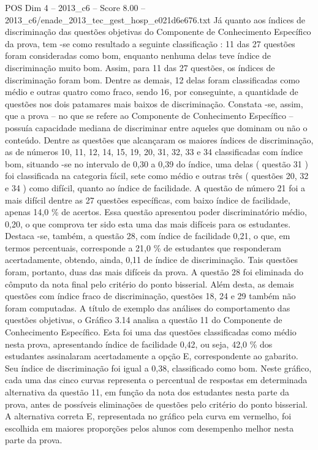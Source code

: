 \begin{textsample}{POS Dim 4 – 2013\_c6 – Score 8.00 – 2013\_c6/enade\_2013\_tec\_gest\_hosp\_e021d6e676.txt}
Já quanto aos índices de discriminação das questões objetivas do Componente de Conhecimento Específico da prova, tem -se como resultado a seguinte classificação : 11 das 27 questões foram consideradas como bom, enquanto nenhuma delas teve índice de discriminação muito bom.
Assim, para 11 das 27 questões, os índices de discriminação foram bom.
Dentre as demais, 12 delas foram classificadas como médio e outras quatro como fraco, sendo 16, por conseguinte, a quantidade de questões nos dois patamares mais baixos de discriminação.
Constata -se, assim, que a prova – no que se refere ao Componente de Conhecimento Específico – possuía capacidade mediana de discriminar entre aqueles que dominam ou não o conteúdo.
Dentre as questões que alcançaram os maiores índices de discriminação, as de números 10, 11, 12, 14, 15, 19, 20, 31, 32, 33 e 34 classificadas com índice bom, situando -se no intervalo de 0,30 a 0,39 do índice, uma delas ( questão 31 ) foi classificada na categoria fácil, sete como médio e outras três ( questões 20, 32 e 34 ) como difícil, quanto ao índice de facilidade.
A questão de número 21 foi a mais difícil dentre as 27 questões específicas, com baixo índice de facilidade, apenas 14,0 \% de acertos.
Essa questão apresentou poder discriminatório médio, 0,20, o que comprova ter sido esta uma das mais difíceis para os estudantes.
Destaca -se, também, a questão 28, com índice de facilidade 0,21, o que, em termos percentuais, corresponde a 21,0 \% de estudantes que responderam acertadamente, obtendo, ainda, 0,11 de índice de discriminação.
Tais questões foram, portanto, duas das mais difíceis da prova.
A questão 28 foi eliminada do cômputo da nota final pelo critério do ponto bisserial.
Além desta, as demais questões com índice fraco de discriminação, questões 18, 24 e 29 também não foram computadas.
A título de exemplo das análises do comportamento das questões objetivas, o Gráfico 3.14 analisa a questão 11 do Componente de Conhecimento Específico.
Esta foi uma das questões classificadas como médio nesta prova, apresentando índice de facilidade 0,42, ou seja, 42,0 \% dos estudantes assinalaram acertadamente a opção E, correspondente ao gabarito.
Seu índice de discriminação foi igual a 0,38, classificado como bom.
Neste gráfico, cada uma das cinco curvas representa o percentual de respostas em determinada alternativa da questão 11, em função da nota dos estudantes nesta parte da prova, antes de possíveis eliminações de questões pelo critério do ponto bisserial.
A alternativa correta E, representada no gráfico pela curva em vermelho, foi escolhida em maiores proporções pelos alunos com desempenho melhor nesta parte da prova.

\end{textsample}
